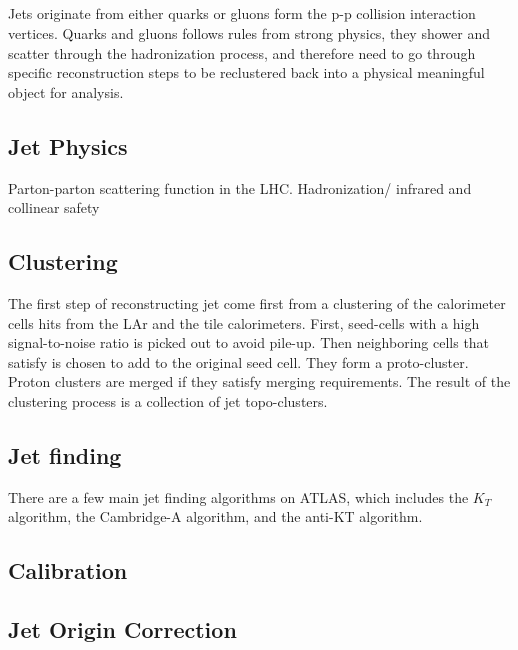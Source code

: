 
\subsection{}

%

Jets originate from either quarks or gluons form the p-p collision interaction vertices. Quarks and gluons follows rules from strong physics, they shower and scatter through the hadronization process, and therefore need to go through specific reconstruction steps to be reclustered back into a physical meaningful object for analysis. 

\subsection{Jet Physics}
Parton-parton scattering function in the LHC. 
Hadronization/ infrared and collinear safety

\subsection{Clustering}
The first step of reconstructing jet come first from a clustering of the calorimeter cells hits from the LAr and the tile calorimeters. First, seed-cells with a high signal-to-noise ratio is picked out to avoid pile-up. Then neighboring cells that satisfy  is chosen to add to the original seed cell. They form a proto-cluster. Proton clusters are merged if they satisfy merging requirements. The result of the clustering process is a collection of jet topo-clusters. 

\subsection{Jet finding}
There are a few main jet finding algorithms on ATLAS, which includes the $K_{T}$ algorithm, the Cambridge-A algorithm, and the anti-KT algorithm. 
\subsection{Calibration}
\subsection{Jet Origin Correction}



